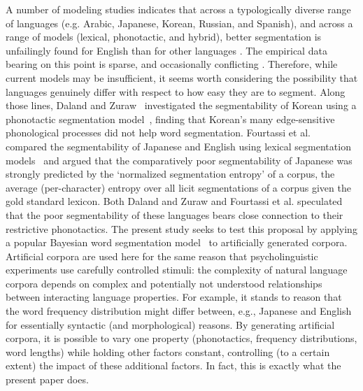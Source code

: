 \documentclass[11pt]{article}
\begin{document}
A number of modeling studies indicates that across a typologically diverse range of languages (e.g. Arabic, Japanese, Korean, Russian, and Spanish), and across a range of models (lexical, phonotactic, and hybrid), better segmentation is unfailingly found for English than for other languages \cite{Fleck08a,Daland09a,Daland11a,Fourtassi13a,Daland13a}. The empirical data bearing on this point is sparse, and occasionally conflicting \cite{Nazzi06a,Nazzi14a}. Therefore, while current models may be insufficient, it seems worth considering the possibility that languages genuinely differ with respect to how easy they are to segment. Along those lines, Daland and Zuraw~ investigated the segmentability of Korean using a phonotactic segmentation model~\cite{Daland11a}, finding that Korean's many edge-sensitive phonological processes did not help word segmentation. Fourtassi et al.~ compared the segmentability of Japanese and English using lexical segmentation models~\cite{Goldwater09a,Johnson09a} and argued that the comparatively poor segmentability of Japanese was strongly predicted by the `normalized segmentation entropy' of a corpus, the average (per-character) entropy over all licit segmentations of a corpus given the gold standard lexicon. Both Daland and Zuraw and Fourtassi et al. speculated that the poor segmentability of these languages bears close connection to their restrictive phonotactics. The present study seeks to test this proposal by applying a popular Bayesian word segmentation model~\cite{Brent99a,Goldwater07c,Goldwater09a} to artificially generated corpora. Artificial corpora are used here for the same reason that psycholinguistic experiments use carefully controlled stimuli: the complexity of natural language corpora depends on complex and potentially not understood relationships between interacting language properties. For example, it stands to reason that the word frequency distribution might differ between, e.g., Japanese and English for essentially syntactic (and morphological) reasons. By generating artificial corpora, it is possible to vary one property (phonotactics, frequency distributions, word lengths) while holding other factors constant, controlling (to a certain extent) the impact of these additional factors. In fact, this is exactly what the present paper does.
\end{document}
